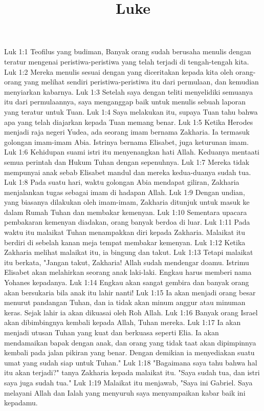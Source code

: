

\title{Luke}

Luk 1:1  Teofilus yang budiman, Banyak orang sudah berusaha menulis dengan teratur mengenai peristiwa-peristiwa yang telah terjadi di tengah-tengah kita.
Luk 1:2  Mereka menulis sesuai dengan yang diceritakan kepada kita oleh orang-orang yang melihat sendiri peristiwa-peristiwa itu dari permulaan, dan kemudian menyiarkan kabarnya.
Luk 1:3  Setelah saya dengan teliti menyelidiki semuanya itu dari permulaannya, saya menganggap baik untuk menulis sebuah laporan yang teratur untuk Tuan.
Luk 1:4  Saya melakukan itu, supaya Tuan tahu bahwa apa yang telah diajarkan kepada Tuan memang benar.
Luk 1:5  Ketika Herodes menjadi raja negeri Yudea, ada seorang imam bernama Zakharia. Ia termasuk golongan imam-imam Abia. Istrinya bernama Elisabet, juga keturunan imam.
Luk 1:6  Kehidupan suami istri itu menyenangkan hati Allah. Keduanya mentaati semua perintah dan Hukum Tuhan dengan sepenuhnya.
Luk 1:7  Mereka tidak mempunyai anak sebab Elisabet mandul dan mereka kedua-duanya sudah tua.
Luk 1:8  Pada suatu hari, waktu golongan Abia mendapat giliran, Zakharia menjalankan tugas sebagai imam di hadapan Allah.
Luk 1:9  Dengan undian, yang biasanya dilakukan oleh imam-imam, Zakharia ditunjuk untuk masuk ke dalam Rumah Tuhan dan membakar kemenyan.
Luk 1:10  Sementara upacara pembakaran kemenyan diadakan, orang banyak berdoa di luar.
Luk 1:11  Pada waktu itu malaikat Tuhan menampakkan diri kepada Zakharia. Malaikat itu berdiri di sebelah kanan meja tempat membakar kemenyan.
Luk 1:12  Ketika Zakharia melihat malaikat itu, ia bingung dan takut.
Luk 1:13  Tetapi malaikat itu berkata, "Jangan takut, Zakharia! Allah sudah mendengar doamu. Istrimu Elisabet akan melahirkan seorang anak laki-laki. Engkau harus memberi nama Yohanes kepadanya.
Luk 1:14  Engkau akan sangat gembira dan banyak orang akan bersukaria bila anak itu lahir nanti!
Luk 1:15  Ia akan menjadi orang besar menurut pandangan Tuhan, dan ia tidak akan minum anggur atau minuman keras. Sejak lahir ia akan dikuasai oleh Roh Allah.
Luk 1:16  Banyak orang Israel akan dibimbingnya kembali kepada Allah, Tuhan mereka.
Luk 1:17  Ia akan menjadi utusan Tuhan yang kuat dan berkuasa seperti Elia. Ia akan mendamaikan bapak dengan anak, dan orang yang tidak taat akan dipimpinnya kembali pada jalan pikiran yang benar. Dengan demikian ia menyediakan suatu umat yang sudah siap untuk Tuhan."
Luk 1:18  "Bagaimana saya tahu bahwa hal itu akan terjadi?" tanya Zakharia kepada malaikat itu. "Saya sudah tua, dan istri saya juga sudah tua."
Luk 1:19  Malaikat itu menjawab, "Saya ini Gabriel. Saya melayani Allah dan Ialah yang menyuruh saya menyampaikan kabar baik ini kepadamu.
